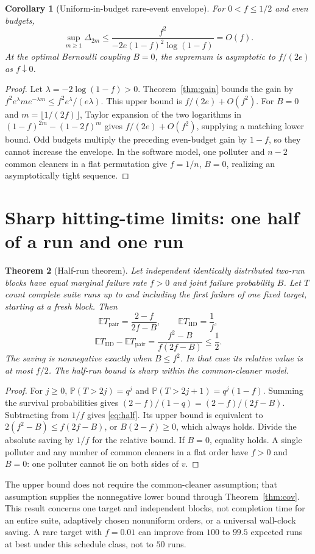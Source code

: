 \documentclass[11pt,a4paper]{article}
\newtheorem{theorem}{Theorem}[section]
\newtheorem{corollary}[theorem]{Corollary}
\theoremstyle{definition}\newtheorem{definition}[theorem]{Definition}
\theoremstyle{remark}\newtheorem{remark}[theorem]{Remark}
\newcommand{\E}{\mathbb E}
\newcommand{\Prb}{\mathbb P}
\newcommand{\IID}{\mathrm{IID}}
\newcommand{\PAIR}{\mathrm{pair}}
\theoremstyle{definition}\newtheorem{xexample}[xtheorem]{Example}\theoremstyle{plain}
\begin{document}
\begin{corollary}[Uniform-in-budget rare-event envelope]
For $0<f\le1/2$ and even budgets,
\[
 \sup_{m\ge1}\Delta_{2m}
 \le \frac{f^2}{-2e(1-f)^2\log(1-f)}=O(f).
\]
At the optimal Bernoulli coupling $B=0$, the supremum is asymptotic to $f/(2e)$ as $f\downarrow0$.
\end{corollary}
\begin{proof}
Let $\lambda=-2\log(1-f)>0$. Theorem~\ref{thm:gain} bounds the gain by $f^2e^\lambda m e^{-\lambda m}\le f^2e^\lambda/(e\lambda)$. This upper bound is $f/(2e)+O(f^2)$. For $B=0$ and $m=\lfloor1/(2f)\rfloor$, Taylor expansion of the two logarithms in
$(1-f)^{2m}-(1-2f)^m$ gives $f/(2e)+O(f^2)$, supplying a matching lower bound. Odd budgets multiply the preceding even-budget gain by $1-f$, so they cannot increase the envelope. In the software model, one polluter and $n-2$ common cleaners in a flat permutation give $f=1/n$, $B=0$, realizing an asymptotically tight sequence.
\end{proof}

\section{Sharp hitting-time limits: one half of a run and one run}
\begin{theorem}[Half-run theorem]\label{thm:half}
Let independent identically distributed two-run blocks have equal marginal failure rate $f>0$ and joint failure probability $B$. Let $T$ count complete suite runs up to and including the first failure of one fixed target, starting at a fresh block. Then
\begin{equation}\label{eq:firsttime}
 \E T_{\PAIR}=\frac{2-f}{2f-B},\qquad
 \E T_{\IID}=\frac1f,
\end{equation}
\begin{equation}\label{eq:half}
 \E T_{\IID}-\E T_{\PAIR}
 =\frac{f^2-B}{f(2f-B)}\le\frac12.
\end{equation}
The saving is nonnegative exactly when $B\le f^2$. In that case its relative value is at most $f/2$. The half-run bound is sharp within the common-cleaner model.
\end{theorem}
\begin{proof}
For $j\ge0$, $\Prb(T>2j)=q^j$ and $\Prb(T>2j+1)=q^j(1-f)$. Summing the survival probabilities gives $(2-f)/(1-q)=(2-f)/(2f-B)$. Subtracting from $1/f$ gives \eqref{eq:half}. Its upper bound is equivalent to
$2(f^2-B)\le f(2f-B)$, or $B(2-f)\ge0$, which always holds. Divide the absolute saving by $1/f$ for the relative bound. If $B=0$, equality holds. A single polluter and any number of common cleaners in a flat order have $f>0$ and $B=0$: one polluter cannot lie on both sides of $v$.
\end{proof}
The upper bound does not require the common-cleaner assumption; that assumption supplies the nonnegative lower bound through Theorem~\ref{thm:cov}. This result concerns one target and independent blocks, not completion time for an entire suite, adaptively chosen nonuniform orders, or a universal wall-clock saving. A rare target with $f=0.01$ can improve from $100$ to $99.5$ expected runs at best under this schedule class, not to $50$ runs.
\end{document}
